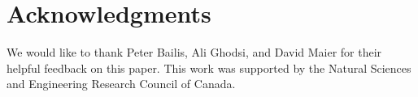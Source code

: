 \section*{Acknowledgments}
We would like to thank Peter Bailis, Ali Ghodsi, and David Maier for their
helpful feedback on this paper.  This work was supported by the Natural Sciences
and Engineering Research Council of Canada.
